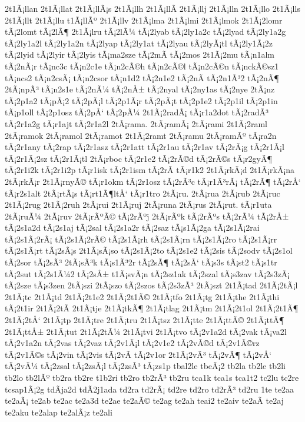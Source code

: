 {2t1Ã¡llan
2t1Ã¡llat
2t1Ã¡llÃ¡s
2t1Ã¡llh
2t1Ã¡llÃ­
2t1Ã¡llj
2t1Ã¡lln
2t1Ã¡llo
2t1Ã¡lls
2t1Ã¡llt
2t1Ã¡llu
t1Ã¡llÃº
2t1Ã¡llv
2t1Ã¡lma
2t1Ã¡lmi
2t1Ã¡lmok
2t1Ã¡2lomr
tÃ¡2lomt
tÃ¡2lÃ¶
2t1Ã¡lru
tÃ¡2lÃ¼
tÃ¡2lyab
tÃ¡2ly1a2c
tÃ¡2lyad
tÃ¡2ly1a2g
tÃ¡2ly1a2l
tÃ¡2ly1a2n
tÃ¡2lyap
tÃ¡2ly1at
tÃ¡2lyau
tÃ¡2lyÃ¡tl
tÃ¡2ly1Ã¡2z
tÃ¡2lyid
tÃ¡2lyir
tÃ¡2lyis
tÃ¡ma2sze
tÃ¡2mÃ­
tÃ¡2mos
2t1Ã¡2mu
tÃ¡n1alm
tÃ¡2nÃ¡r
tÃ¡nc3c
tÃ¡n2c1e
tÃ¡n2cÃ©h
tÃ¡n2cÃ©l
tÃ¡n2cÃ©n
tÃ¡nckÃ©sz1
tÃ¡ncs2
tÃ¡n2csÃ¡
tÃ¡n2csor
tÃ¡n1d2
tÃ¡2n1e2
tÃ¡2nÃ­
tÃ¡2n1Ã³2
tÃ¡2nÃ¶
2tÃ¡npÃ³
tÃ¡n2s1e
tÃ¡2nÃ¼
tÃ¡2nÅ±
tÃ¡2nyal
tÃ¡2ny1as
tÃ¡2nye
2tÃ¡nz
tÃ¡2p1a2
tÃ¡pÃ¡2
tÃ¡2pÃ¡l
tÃ¡2p1Ã¡r
tÃ¡2pÃ¡t
tÃ¡2p1e2
tÃ¡2p1il
tÃ¡2p1in
tÃ¡p1oll
tÃ¡2p1osz
tÃ¡2pÅ‘
tÃ¡2pÃ¼
2t1Ã¡2radÃ¡
tÃ¡r1a2dot
tÃ¡2radÃ³
tÃ¡2r1a2g
tÃ¡r1ajt
tÃ¡2r1a2l
2tÃ¡rama.
2tÃ¡ramÃ¡
2tÃ¡rami
2t1Ã¡2raml
2tÃ¡ramok
2tÃ¡ramol
2tÃ¡ramot
2t1Ã¡2ramt
2tÃ¡ramu
2tÃ¡ramÃº
tÃ¡ra2n
tÃ¡2r1any
tÃ¡2rap
tÃ¡2r1asz
tÃ¡2r1att
tÃ¡2r1au
tÃ¡2r1av
tÃ¡2rÃ¡g
tÃ¡2r1Ã¡l
tÃ¡2r1Ã¡2sz
tÃ¡2r1Ã¡tl
2tÃ¡rboc
tÃ¡2r1e2
tÃ¡2rÃ©d
tÃ¡2rÃ©s
tÃ¡r2gyÃ¶
tÃ¡2r1i2k
tÃ¡2r1i2p
tÃ¡r1isk
tÃ¡2r1ism
tÃ¡2rÃ­
tÃ¡r1k2
2t1Ã¡rkÃ¡d
2t1Ã¡rkÃ¡na
2tÃ¡rkÃ¡r
2t1Ã¡rnyÃ©
tÃ¡r1okm
tÃ¡2r1osz
tÃ¡2rÃ³c
tÃ¡r1Ã³rÃ¡
tÃ¡2rÃ¶
tÃ¡2rÅ‘
tÃ¡r2s1alt
2tÃ¡rtÃ¡s
tÃ¡rt1Ã¶ltÅ‘
tÃ¡r1tro
2tÃ¡ru.
2tÃ¡rua
2tÃ¡rub
2tÃ¡ruc
2t1Ã¡2rug
2t1Ã¡2ruh
2tÃ¡rui
2t1Ã¡ruj
2tÃ¡runa
2tÃ¡rus
2tÃ¡rut.
tÃ¡r1uta
2tÃ¡ruÃ¼
2tÃ¡ruv
2tÃ¡rÃºÃ©
tÃ¡2rÃºj
2tÃ¡rÃºk
tÃ¡2rÃºs
tÃ¡2rÃ¼
tÃ¡2rÅ±
tÃ¡2s1a2d
tÃ¡2s1aj
tÃ¡2sal
tÃ¡2s1a2r
tÃ¡2saz
tÃ¡s1Ã¡2ga
tÃ¡2s1Ã¡2rai
tÃ¡2s1Ã¡2rÃ¡
tÃ¡2s1Ã¡2rÃ©
tÃ¡2s1Ã¡rh
tÃ¡2s1Ã¡rn
tÃ¡2s1Ã¡2ro
tÃ¡2s1Ã¡rr
tÃ¡2s1Ã¡rt
tÃ¡2sÃ¡s
2t1Ã¡sÃ¡so
tÃ¡2s1Ã¡2to
tÃ¡2s1e2
tÃ¡2sis
tÃ¡2sodv
tÃ¡2s1ol
tÃ¡2sor
tÃ¡2sÃ³
2tÃ¡sÃ³k
tÃ¡s1Ã³2r
tÃ¡2sÃ¶
tÃ¡2sÅ‘
tÃ¡s3s
tÃ¡st2
tÃ¡s1tr
tÃ¡2sut
tÃ¡2s1Ã¼2
tÃ¡2sÅ±
t1Ã¡svÃ¡n
tÃ¡2sz1ak
tÃ¡2szal
tÃ¡s3zav
tÃ¡2s3zÃ¡
tÃ¡2sze
tÃ¡s3zen
2tÃ¡szi
2tÃ¡szo
tÃ¡2szos
tÃ¡2s3zÃ³
2tÃ¡szt
2t1Ã¡tad
2t1Ã¡2tÃ¡l
2t1Ã¡tc
2t1Ã¡td
2t1Ã¡2t1e2
2t1Ã¡2t1Ã©
2t1Ã¡tfo
2t1Ã¡tg
2t1Ã¡the
2t1Ã¡thi
tÃ¡2t1ir
2t1Ã¡2tÃ­
2t1Ã¡tje
2t1Ã¡tkÃ¶
2t1Ã¡tlag
2t1Ã¡tm
2t1Ã¡2t1ol
2t1Ã¡2t1Ã¶
2t1Ã¡2tÅ‘
2t1Ã¡tp
2t1Ã¡tre
2t1Ã¡tru
2t1Ã¡tsz
2t1Ã¡tte
2t1Ã¡ttÃ©
2t1Ã¡ttÃ¶
2t1Ã¡ttÅ±
2t1Ã¡tut
2t1Ã¡2tÃ¼
2t1Ã¡tvi
2t1Ã¡tvo
tÃ¡2v1a2d
tÃ¡2vak
tÃ¡va2l
tÃ¡2v1a2n
tÃ¡2vas
tÃ¡2vaz
tÃ¡2v1Ã¡l
tÃ¡2v1e2
tÃ¡2vÃ©d
tÃ¡2v1Ã©rz
tÃ¡2v1Ã©s
tÃ¡2vin
tÃ¡2vis
tÃ¡2vÃ­
tÃ¡2v1or
2t1Ã¡2vÃ³
tÃ¡2vÃ¶
tÃ¡2vÅ‘
tÃ¡2vÃ¼
tÃ¡2zsal
tÃ¡2zsÃ¡l
tÃ¡2zsÃ³
tÃ¡zs1p
tbal2le
tbeÃ¡2
tb2la
tb2le
tb2li
tb2lo
tb2lÃº
tb2ra
tb2re
t1b2ri
tb2ro
tb2rÃ³
tb2ru
tca1k
tca1s
tca1t2
tc2lu
tc2re
tcsap1Ã¡2g
tdÃ­ja2d
tdÃ­2j1ada
td2ra
td2rÃ¡
td2re
td2ro
td2rÃ³
td2ru
1te
te2aa
te2aÃ¡
te2ab
te2ac
te2a3d
te2ae
te2aÃ©
te2ag
te2ah
teai2
te2aiv
te2aÃ­
te2aj
te2aku
te2alap
te2alÃ¡z
te2ali
}
